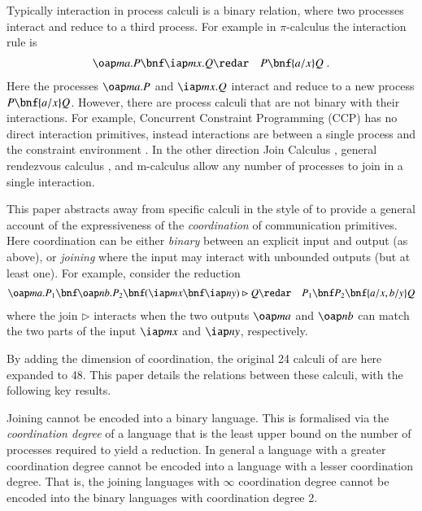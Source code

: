 \documentclass[submission,copyright,creativecommons]{eptcs}
\newcommand{\join}[1]{(#1)\rhd }
\begin{document}
Typically interaction in process calculi is a binary relation, where two processes interact
and reduce to a third process. For example in $\pi$-calculus the interaction rule is
\begin{eqnarray*}
\oap m a .P \bnf \iap m x .Q & \redar & P \bnf \{a/x\} Q\; .
\end{eqnarray*}
Here the processes $\oap m a .P$ and $\iap m x .Q$ interact and reduce to a new process $P \bnf \{a/x\}Q$.
However, there are process calculi that are not binary with their interactions.
For example, Concurrent Constraint Programming (CCP) has no direct interaction primitives, instead interactions are between a single process and the constraint environment \cite{Saraswat:1991:SFC:99583.99627}.
In the other direction Join Calculus \cite{Fournet_thereflexive}, general rendezvous calculus \cite{Bocchi2004119}, and m-calculus \cite{DBLP:conf/popl/SchmittS03}
allow any number of processes to join in a single interaction. 

This paper abstracts away from specific calculi in the style of \cite{G:IC08,givenwilson:hal-01026301}
to provide a general account of the expressiveness of the {\em coordination} of
communication primitives.
Here coordination can be either {\em binary} between an explicit input and output (as above),
or {\em joining} where the input may interact with unbounded outputs (but at least one).
For example, consider the reduction
\begin{eqnarray*}
\oap m a . P_1 \bnf \oap n b . P_2 \bnf \join{\iap m x \bnf \iap n y}Q
&\redar& P_1\bnf P_2\bnf \{a/x,b/y\}Q
\end{eqnarray*}
where the join $\rhd$ interacts when the two outputs $\oap m a$ and $\oap n b$ can
match the two parts of the input $\iap m x$ and $\iap n y$, respectively.


By adding the dimension of coordination, the original 24 calculi of
\cite{G:IC08,givenwilson:hal-01026301}
are here expanded to 48.
This paper details the relations between these calculi, with the following key results.

Joining cannot be encoded into a binary language. This is formalised via the {\em coordination degree}
of a language that is the least upper bound on the number of processes required to yield a reduction.
In general a language with a greater coordination degree cannot be encoded into a language with a
lesser coordination degree. That is, the joining languages with $\infty$ coordination degree cannot be
encoded into the binary languages with coordination degree 2.
\end{document}
